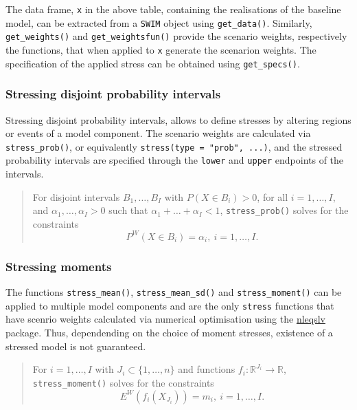 \documentclass[]{article}
\begin{document}
The data frame, \texttt{x} in the above table, containing the realisations of the baseline model, can be extracted from a \texttt{SWIM} object using \texttt{get\_data()}. Similarly, \texttt{get\_weights()} and \texttt{get\_weightsfun()} provide the scenario weights, respectively the functions, that when applied to \texttt{x} generate the scenarion weights. The specification of the applied stress can be obtained using \texttt{get\_specs()}.

\hypertarget{stressing-disjoint-probability-intervals}{%
\subsubsection{Stressing disjoint probability intervals}\label{stressing-disjoint-probability-intervals}}

Stressing disjoint probability intervals, allows to define stresses by altering regions or events of a model component. The scenario weights are calculated via \texttt{stress\_prob()}, or equivalently \texttt{stress(type\ =\ "prob",\ ...)}, and the stressed probability intervals are specified through the \texttt{lower} and \texttt{upper} endpoints of the intervals.

\begin{quote}
For disjoint intervals \(B_1, \ldots, B_I\) with \(P(X \in B_i) >0\), for all \(i = 1, \ldots, I\), and \(\alpha_1, \ldots, \alpha_I > 0\) such that \(\alpha_1 + \ldots + \alpha_I < 1\), \texttt{stress\_prob()} solves for the constraints
\begin{equation} 
P^W(X \in B_i) = \alpha_i, ~i = 1, \ldots, I. \label{eq:optimisationprob}
\end{equation}
\end{quote}

\hypertarget{stressing-moments}{%
\subsubsection{Stressing moments}\label{stressing-moments}}

The functions \texttt{stress\_mean()}, \texttt{stress\_mean\_sd()} and \texttt{stress\_moment()} can be applied to multiple model components and are the only \texttt{stress} functions that have scenrio weights calculated via numerical optimisation using the \href{https://CRAN.R-project.org/package=nleqslv}{nleqslv} package. Thus, dependending on the choice of moment stresses, existence of a stressed model is not guaranteed.

\begin{quote}
For \(i = 1, \ldots, I\) with \(J_i \subset \{1, \ldots, n\}\) and functions \(f_i \colon \mathbb{R}^{J_i} \to \mathbb{R}\), \texttt{stress\_moment()} solves for the constraints
\begin{equation} 
E^W(f_i(X_{J_i}) ) = m_i, ~i = 1, \ldots, I. \label{eq:optimisationmoment}
\end{equation}
\end{quote}
\end{document}

